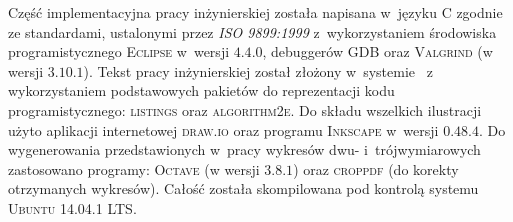 Część implementacyjna pracy inżynierskiej została napisana w~języku \textsf{C} zgodnie ze standardami, ustalonymi przez \textit{\textsc{ISO 9899:1999}} z~wykorzystaniem środowiska programistycznego \textsc{Eclipse} w~wersji \textsc{$4.4.0$}, debuggerów \textsc{GDB} oraz \textsc{Valgrind} (w wersji \textsc{$3.10.1$}). Tekst pracy inżynierskiej został złożony w~systemie \LaTeXe~z wykorzystaniem podstawowych pakietów do reprezentacji kodu programistycznego: \textsc{listings} oraz \textsc{algorithm2e}. Do składu wszelkich ilustracji użyto aplikacji internetowej \textsc{draw.io} oraz programu \textsc{Inkscape} w~wersji \textsc{$0.48.4$}. Do wygenerowania przedstawionych w~pracy wykresów dwu- i~trójwymiarowych zastosowano programy: \textsc{Octave} (w wersji \textsc{$3.8.1$}) oraz \textsc{croppdf} (do korekty otrzymanych wykresów). Całość została skompilowana pod kontrolą systemu \textsc{Ubuntu 14.04.1 LTS}.
